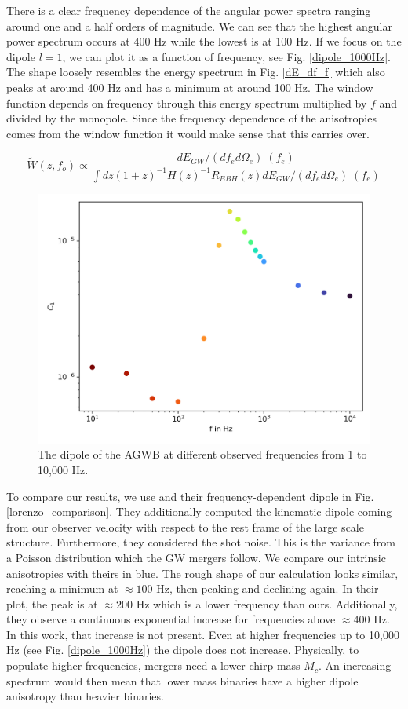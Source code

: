 There is a clear frequency dependence of the angular power spectra ranging around one and a half orders of magnitude. We can see that the highest angular power spectrum occurs at 400 Hz while the lowest is at 100 Hz. If we focus on the dipole $l=1$, we can plot it as a function of frequency, see Fig. \ref{dipole_1000Hz}. The shape loosely resembles the energy spectrum in Fig. \ref{dE_df_f} which also peaks at around 400 Hz and has a minimum at around 100 Hz. The window function depends on frequency through this energy spectrum multiplied by $f$ and divided by the monopole. Since the frequency dependence of the anisotropies comes from the window function it would make sense that this carries over.

\begin{equation}
    \tilde{W}(z, f_o)\propto \frac{dE_{GW}/(df_e d\Omega_e)\;(f_e)}{\int dz (1+z)^{-1}H(z)^{-1}R_{BBH}(z) dE_{GW}/(df_e d\Omega_e)\;(f_e)}
\end{equation}

\begin{figure}
    \centering
    \includegraphics[width=0.8\linewidth]{Images/dipole_frequencies_10000Hz.png}
    \caption{The dipole of the AGWB at different observed frequencies from 1 to 10,000 Hz.}
    \label{dipole_10000Hz}
\end{figure} 

To compare our results, we use \cite{dallarmi_dipole_2022} and their frequency-dependent dipole in Fig. \ref{lorenzo_comparison}. They additionally computed the kinematic dipole coming from our observer velocity with respect to the rest frame of the large scale structure. Furthermore, they considered the shot noise. This is the variance from a Poisson distribution which the GW mergers follow. We compare our intrinsic anisotropies with theirs in blue. The rough shape of our calculation looks similar, reaching a minimum at $\approx 100$ Hz, then peaking and declining again. In their plot, the peak is at $\approx 200$ Hz which is a lower frequency than ours. Additionally, they observe a continuous exponential increase for frequencies above $\approx 400$ Hz. In this work, that increase is not present. Even at higher frequencies up to 10,000 Hz (see Fig. \ref{dipole_1000Hz}) the dipole does not increase. Physically, to populate higher frequencies, mergers need a lower chirp mass $M_c$. An increasing spectrum would then mean that lower mass binaries have a higher dipole anisotropy than heavier binaries.

